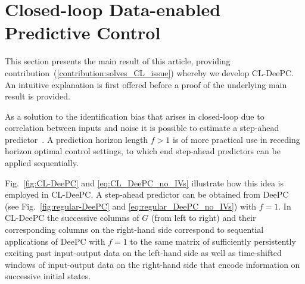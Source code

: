 \section{Closed-loop Data-enabled Predictive Control}
This section presents the main result of this article, providing contribution~(\ref{contribution:solves_CL_issue}) whereby we develop \ac{CL-DeePC}. An intuitive explanation is first offered before a proof of the underlying main result is provided.

As a solution to the identification bias that arises in closed-loop due to correlation between inputs and noise %
it is possible to estimate a step-ahead predictor~\citep{Ljung1996}. A prediction horizon length ${f>1}$ is of more practical use in receding horizon optimal control settings, to which end step-ahead predictors can be applied sequentially. 

Fig.~\ref{fig:CL-DeePC} and \eqref{eq:CL_DeePC_no_IVs} illustrate how this idea is employed in \ac{CL-DeePC}. A step-ahead predictor can be obtained from \ac{DeePC} (see Fig.~\ref{fig:regular-DeePC} and \eqref{eq:regular_DeePC_no_IVs}) with $f=1$. In \ac{CL-DeePC} the successive columns of $G$ (from left to right) and their corresponding columns on the right-hand side correspond to sequential applications of \ac{DeePC} with $f=1$ to the same matrix of sufficiently persistently exciting past input-output data on the left-hand side as well as time-shifted windows of input-output data on the right-hand side that encode information on successive initial states.

